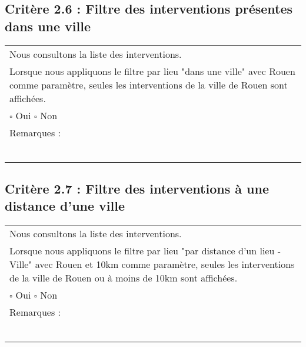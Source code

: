   	\subsection*{Critère 2.6 : Filtre des interventions présentes dans une ville}
  		\begin{center}
    	 		\begin{tabular}[h]{|p{}|}
			\hline
				Nous consultons la liste des interventions. \\
				Lorsque nous appliquons le filtre par lieu "dans une ville" avec Rouen comme paramètre, seules les interventions de la ville de Rouen sont affichées. \\
						
				$\square$ Oui  \hfill \hfill $\square$ Non \\\hline Remarques : \\ ~\\
			 \\\hline
     		\end{tabular}
  		\end{center}	
  		
  	\subsection*{Critère 2.7 : Filtre des interventions à une distance d'une ville}
  		\begin{center}
    	 		\begin{tabular}[h]{|p{}|}
			\hline
				Nous consultons la liste des interventions. \\
				Lorsque nous appliquons le filtre par lieu "par distance d'un lieu - Ville" avec Rouen et 10km comme paramètre, seules les interventions de la ville de Rouen ou à moins de 10km sont affichées. \\
						
				$\square$ Oui  \hfill \hfill $\square$ Non \\\hline Remarques : \\ ~\\
			 \\\hline
     		\end{tabular}
  		\end{center}	
  		

